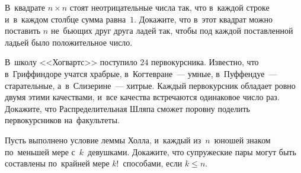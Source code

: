 \begin{problems}
\item
В~квадрате $n \times n$ стоят неотрицательные числа так, что в~каждой строке
и~в~каждом столбце сумма равна~$1$.
Докажите, что в~этот квадрат можно поставить $n$ не~бьющих друг друга ладей
так, чтобы под каждой поставленной ладьей было положительное число.

\item
В~школу <<Хогвартс>> поступило $24$ первокурсника.
Известно, что в~Гриффиндоре учатся храбрые, в~Когтевране~--- умные,
в~Пуффендуе~--- старательные, а~в~Слизерине~--- хитрые.
Каждый первокурсник обладает ровно двумя этими качествами, и~все качества
встречаются одинаковое число раз.
Докажите, что Распределительная Шляпа сможет поровну поделить первокурсников
на~факультеты.

\item
Пусть выполнено условие леммы Холла, и~каждый из~$n$~юношей знаком по~меньшей
мере с~$k$~девушками.
Докажите, что супружеские пары могут быть составлены по~крайней мере
$k!$~способами, если $k \leq n$.

\end{problems}

